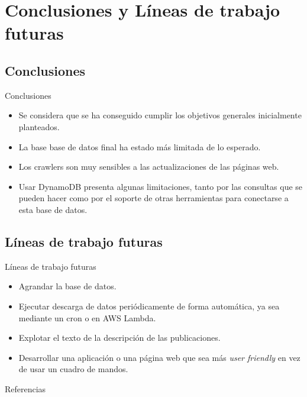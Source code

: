 \documentclass[aspectratio=149]{beamer}
\begin{document}
\section{Conclusiones y Líneas de trabajo futuras}

\subsection{Conclusiones}
\begin{frame}[label=conclu]{Conclusiones}
    \begin{itemize}
        \item Se considera que se ha conseguido cumplir los objetivos generales inicialmente planteados.
        \item La base base de datos final ha estado más limitada de lo esperado.
        \item Los crawlers son muy sensibles a las actualizaciones de las páginas web.
        \item Usar DynamoDB presenta algunas limitaciones, tanto por las consultas que se pueden hacer como por el soporte de otras herramientas para conectarse a esta base de datos.
    \end{itemize}
\end{frame}

\subsection{Líneas de trabajo futuras}
\begin{frame}[label=lineas]{Líneas de trabajo futuras}
    \begin{itemize}
        \item Agrandar la base de datos.
        \item Ejecutar descarga de datos periódicamente de forma automática, ya sea mediante un cron o en AWS Lambda.
        \item Explotar el texto de la descripción de las publicaciones.
        \item Desarrollar una aplicación o una página web que sea más \textit{user friendly} en vez de usar un cuadro de mandos.
    \end{itemize}
\end{frame}

\begin{frame}[allowframebreaks]{Referencias}
    \printbibliography
\end{frame}
\end{document}
